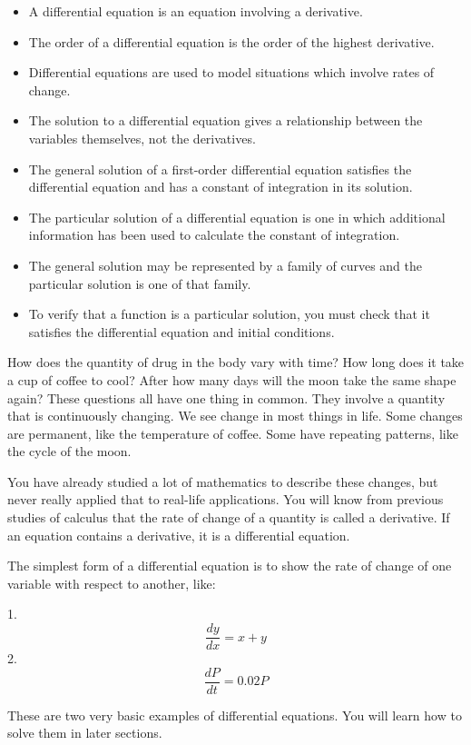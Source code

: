 \begin{itemize}
    \item A differential equation is an equation involving a derivative.
    \item The order of a differential equation is the order of the highest derivative.
    \item Differential equations are used to model situations which involve rates of change.
    \item The solution to a differential equation gives a relationship between the variables themselves, not the derivatives.
    \item The general solution of a first-order differential equation satisfies the differential equation and has a constant of integration in its solution.
    \item The particular solution of a differential equation is one in which additional information has been used to calculate the constant of integration.
    \item The general solution may be represented by a family of curves and the particular solution is one of that family.
    \item To verify that a function is a particular solution, you must check that it satisfies the differential equation and initial conditions.
\end{itemize}

How does the quantity of drug in the body vary with time? How long does it take a cup of coffee to cool? After how many days will the moon take the same shape again? These questions all have one thing in common. They involve a quantity that is continuously changing. We see change in most things in life. Some changes are permanent, like the temperature of coffee. Some have repeating patterns, like the cycle of the moon.

You have already studied a lot of mathematics to describe these changes, but never really applied that to real-life applications. You will know from previous studies of calculus that the rate of change of a quantity is called a derivative. If an equation contains a derivative, it is a differential equation.

The simplest form of a differential equation is to show the rate of change of one variable with respect to another, like:

1. $$\frac{dy}{dx} = x + y$$
2. $$\frac{dP}{dt} = 0.02P$$

These are two very basic examples of differential equations. You will learn how to solve them in later sections.

